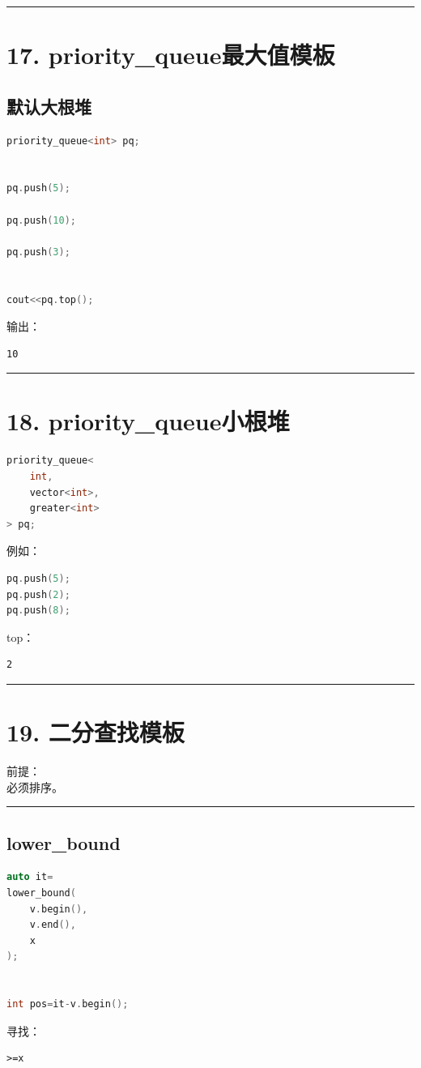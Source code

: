 \documentclass[9pt,twocolumn]{extarticle}
\begin{document}
\noindent\rule{\linewidth}{0.4pt}

\section{17. priority\_queue最大值模板}

\subsection{默认大根堆}
\begin{lstlisting}[language=C++]
priority_queue<int> pq;


pq.push(5);

pq.push(10);

pq.push(3);


cout<<pq.top();
\end{lstlisting}
输出：
\begin{lstlisting}
10
\end{lstlisting}

\noindent\rule{\linewidth}{0.4pt}

\section{18. priority\_queue小根堆}
\begin{lstlisting}[language=C++]
priority_queue<
    int,
    vector<int>,
    greater<int>
> pq;
\end{lstlisting}
例如：
\begin{lstlisting}[language=C++]
pq.push(5);
pq.push(2);
pq.push(8);
\end{lstlisting}
top：
\begin{lstlisting}
2
\end{lstlisting}

\noindent\rule{\linewidth}{0.4pt}

\section{19. 二分查找模板}

前提：\\
必须排序。

\noindent\rule{\linewidth}{0.4pt}

\subsection{lower\_bound}
\begin{lstlisting}[language=C++]
auto it=
lower_bound(
    v.begin(),
    v.end(),
    x
);


int pos=it-v.begin();
\end{lstlisting}
寻找：
\begin{lstlisting}
>=x
\end{lstlisting}
\end{document}
